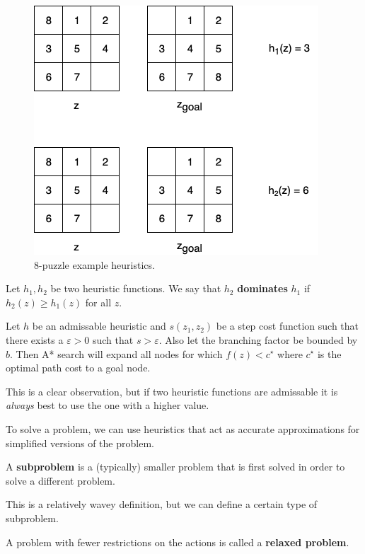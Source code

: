 \begin{figure}
    \centering
    \includegraphics[width=0.6\linewidth]{images/8-puzzle-ex-1.png}
    \caption{$8$-puzzle example heuristics.}
\end{figure}

\begin{definition}[Domination]
    Let $h_1, h_2$ be two heuristic functions. We say that $h_2$ \textbf{dominates} $h_1$ if $h_2(z) \geq h_1(z)$ for all $z$.
\end{definition}

\begin{theorem}[]
    Let $h$ be an admissable heuristic and $s(z_1, z_2)$ be a step cost function such that there exists a $\varepsilon > 0$ such that $s > \varepsilon$. Also let the branching factor be bounded by $b$. Then A* search will expand all nodes for which $f(z) < c^\star$ where $c^\star$ is the optimal path cost to a goal node.
\end{theorem}

\begin{remark}
    This is a clear observation, but if two heuristic functions are admissable it is \emph{always} best to use the one with a higher value.
\end{remark}

To solve a problem, we can use heuristics that act as accurate approximations for simplified versions of the problem.

\begin{definition}[Subproblem]
    A \textbf{subproblem} is a (typically) smaller problem that is first solved in order to solve a different problem.
\end{definition}

This is a relatively wavey definition, but we can define a certain type of subproblem.

\begin{definition}
    A problem with fewer restrictions on the actions is called a \textbf{relaxed problem}.
\end{definition}

